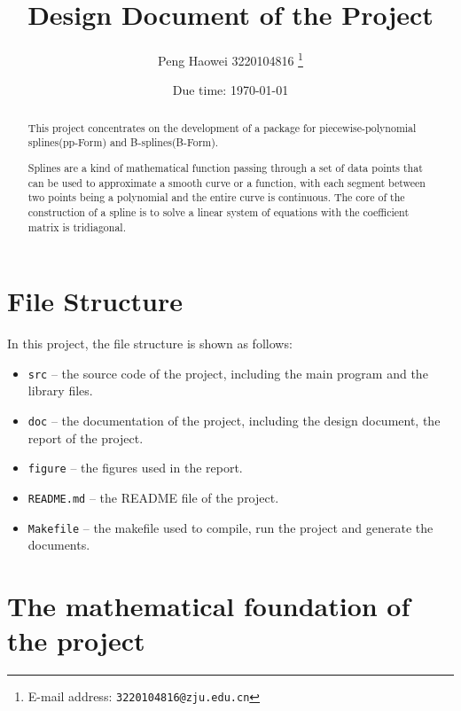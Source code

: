 \documentclass[a4paper]{article}
\theoremstyle{definition}
\begin{document}
\title{\textbf{Design Document of the Project}}

\author{Peng Haowei 3220104816
  \thanks{E-mail address: \texttt{3220104816@zju.edu.cn}}}

\date{Due time: \today}

\maketitle

\begin{abstract}
  This project concentrates on the development of a package for piecewise-polynomial splines(pp-Form) and B-splines(B-Form). 

  Splines are a kind of mathematical function passing through a set of data points that can be used to approximate a smooth curve or a function, with each segment between two points being a polynomial and the entire curve is continuous. 
  The core of the construction of a spline is to solve a linear system of equations with the coefficient matrix is tridiagonal. 
  \end{abstract}

\section{File Structure}

In this project, the file structure is shown as follows:
\begin{itemize}
  \item \verb|src| -- the source code of the project, including the main program and the library files.
  \item \verb|doc| -- the documentation of the project, including the design document, the report of the project.
  \item \verb|figure| -- the figures used in the report.
  \item \verb|README.md| -- the README file of the project.
  \item \verb|Makefile| -- the makefile used to compile, run the project and generate the documents.
\end{itemize}

\section{The mathematical foundation of the project}
\end{document}
